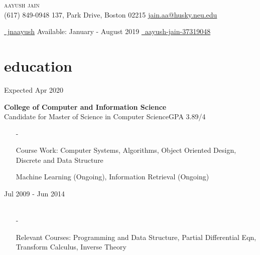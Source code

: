 \documentclass[a4paper, 10pt, oneside]{article}
\begin{document}

\begin{center}
\color{headings}\textsc{\Huge{{aayush jain}}} \\
\vspace{0.0em}
\color{text1}{\Large\Telefon} (617) 849-0948 \hfill \hspace{3.3em}137, Park Drive, Boston 02215 \hfill {\Large\Letter} \href{mailto:jain.aa@husky.neu.edu.com}{jain.aa@husky.neu.edu} 

\vspace{-0.0em}
{\Large\faGithub} \href{https://github.com/jnaayush}{\ jnaayush}
\hfill \hspace{3em} {\selectfont Available: January - August 2019}  
 \hspace{7.8em} {\Large\faLinkedin} \href{https://www.linkedin.com/in/aayush-jain-37319048/}{\ aayush-jain-37319048}

\vspace{-1.2em}
\section{\color{headings}education}
\vspace{-0.5em}
 \hfill {Expected Apr 2020}\\
\raggedright \textbf{College of Computer and Information Science}\\
Candidate for Master of Science in Computer Science\hfill {GPA 3.89/4}\\
\begin{itemize}
\vspace{-0.7em}
\item[-]\raggedright{Course Work:} Computer Systems, Algorithms, Object Oriented Design, Discrete and Data Structure
\vspace{-0.7em}
\item[] Machine Learning (Ongoing), Information Retrieval (Ongoing) \\
\end{itemize}

 \hfill {Jul 2009 - Jun 2014}\\
\color{text1}{Bachelors (Honors) \& Masters (Honors) of Science in Exploration Geophysics} \hfill\\%
\begin{itemize}
\vspace{-0.7em}
\item[-] \raggedright{Relevant Courses:} Programming and Data Structure, Partial Differential Eqn, Transform Calculus, Inverse Theory\\
\vspace{-0.7 em}
\end{itemize}
\end{center}
\end{document}
